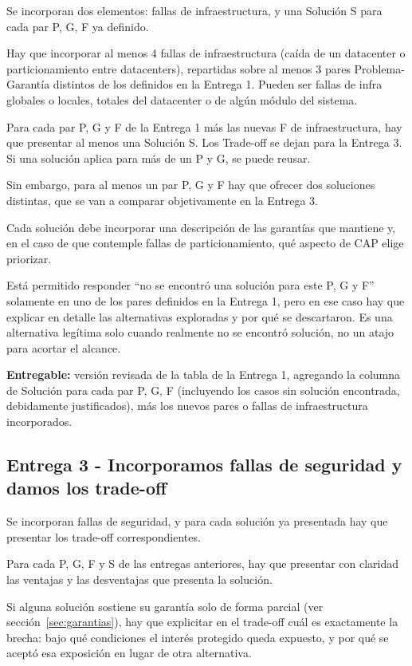\documentclass[variant=guia,cover=institutional,mode=screen]{ua-engineering-v6-article}
\begin{document}
    Se incorporan dos elementos: fallas de infraestructura, y una Solución S para cada par P, G, F ya definido.

    Hay que incorporar al menos 4 fallas de infraestructura (caída de un datacenter o particionamiento entre datacenters), repartidas sobre al menos 3 pares Problema-Garantía distintos de los definidos en la Entrega 1.
    Pueden ser fallas de infra globales o locales, totales del datacenter o de algún módulo del sistema.

    Para cada par P, G y F de la Entrega 1 más las nuevas F de infraestructura, hay que presentar al menos una Solución S. Los Trade-off se dejan para la Entrega 3.
    Si una solución aplica para más de un P y G, se puede reusar.

    Sin embargo, para al menos un par P, G y F hay que ofrecer dos soluciones distintas, que se van a comparar objetivamente en la Entrega 3.

    Cada solución debe incorporar una descripción de las garantías que mantiene y, en el caso de que contemple fallas de particionamiento, qué aspecto de CAP elige priorizar.

    Está permitido responder ``no se encontró una solución para este P, G y F'' solamente en uno de los pares definidos en la Entrega 1, pero en ese caso hay que explicar en detalle las alternativas exploradas y por qué se descartaron.
    Es una alternativa legítima solo cuando realmente no se encontró solución, no un atajo para acortar el alcance.

    \textbf{Entregable:} versión revisada de la tabla de la Entrega 1, agregando la columna de Solución para cada par P, G, F (incluyendo los casos sin solución encontrada, debidamente justificados), más los nuevos pares o fallas de infraestructura incorporados.

    \subsection{Entrega 3 - Incorporamos fallas de seguridad y damos los trade-off}\label{subsec:entrega-3}

    Se incorporan fallas de seguridad, y para cada solución ya presentada hay que presentar los trade-off correspondientes.

    Para cada P, G, F y S de las entregas anteriores, hay que presentar con claridad las ventajas y las desventajas que presenta la solución.

    Si alguna solución sostiene su garantía solo de forma parcial (ver sección~\ref{sec:garantias}), hay que explicitar en el trade-off cuál es exactamente la brecha: bajo qué condiciones el interés protegido queda expuesto, y por qué se aceptó esa exposición en lugar de otra alternativa.
\end{document}
